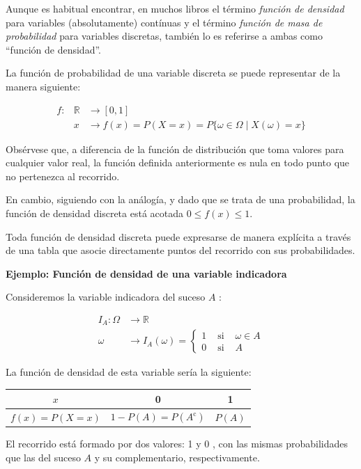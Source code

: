 \documentclass[
]{article}
\begin{document}
Aunque es habitual encontrar, en muchos libros el término \emph{función de densidad} para variables (absolutamente) contínuas y el término \emph{función de masa de probabilidad} para variables discretas, también lo es referirse a ambas como ``función de densidad''.

La función de probabilidad de una variable discreta se puede representar de la manera siguiente:

\[
\begin{array}{rll}
f: & \mathbb{R} & \rightarrow[0,1] \\
& x & \rightarrow f(x)=P(X=x)=P\{\omega \in \Omega \mid X(\omega)=x\}
\end{array}
\]

Obsérvese que, a diferencia de la función de distribución que toma valores para cualquier valor real, la función definida anteriormente es nula en todo punto que no
pertenezca al recorrido.

En cambio, siguiendo con la análogía, y dado que se trata de una probabilidad, la
función de densidad discreta está acotada \(0 \leq f(x) \leq 1\).

Toda
función de densidad discreta puede expresarse de manera explícita a
través de una tabla que asocie directamente puntos del recorrido con sus
probabilidades.

\textbf{Ejemplo: Función de densidad de una variable indicadora}

Consideremos la variable indicadora del suceso \(A\) :

\[
\begin{aligned}
I_{A}: \Omega & \rightarrow \mathbb{R} \\
\omega & \rightarrow I_{A}(\omega)=\left\{\begin{array}{lll}
1 & \text { si } & \omega \in A \\
0 & \text { si } & A
\end{array}\right.
\end{aligned}
\]

La función de densidad de esta variable sería la siguiente:

\begin{longtable}[]{@{}ccc@{}}
\toprule\noalign{}
\(x\) & 0 & 1 \\
\midrule\noalign{}
\endhead
\bottomrule\noalign{}
\endlastfoot
\(f(x)=P(X=x)\) & \(1-P(A)=P\left(A^{\mathrm{c}}\right)\) & \(P(A)\) \\
\end{longtable}

El recorrido está formado por dos valores: 1 y 0 , con las mismas
probabilidades que las del suceso \(A\) y su complementario,
respectivamente.
\end{document}
